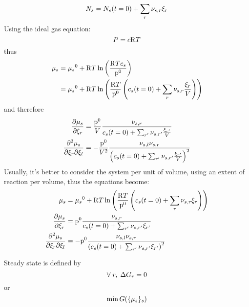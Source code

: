 \begin{equation}
\Mol[s] = \Mol[s](t=0) + \sum_r \scoef[s,r] \ext[r]
\end{equation}
Using the ideal gas equation:
\begin{equation}
\Press = \conc \Rg \Temp
\end{equation}
thus
\begin{equation}
\begin{split}
\chempot[s] & = \chempotZ[s] + \Rg\Temp\ln\left(\frac{\Rg \Temp \molar[s]}{\pz}\right) \\
            & = \chempotZ[s] + \Rg\Temp\ln\left(\frac{\Rg \Temp}{\pz}\left(\molar[s](t=0) + \sum_r \scoef[s,r]\frac{\ext[r]}{\Vol}\right)\right) \\
\end{split}
\end{equation}
and therefore
\begin{equation}
\begin{split}
\doverdext[r]{\chempot[s]}      & = \frac{\pz}{\Vol}\frac{\scoef[s,r]}{\molar[s](t=0) + \sum_{r'} \scoef[s,r']\frac{\ext[r']}{\Vol}}\\
\ddoverddext{\chempot[s]}{r}{l} & = -\frac{\pz}{\Vol^2}\frac{\scoef[s,l]\scoef[s,r]}{\left(\molar[s](t=0) + \sum_{r'} \scoef[s,r']\frac{\ext[r']}{\Vol}\right)^2}\\
\end{split}
\end{equation}
Usually, it's better to consider the system per unit of volume, 
using an extent of reaction per volume, thus the equations
become:
\begin{equation}
\begin{split}
\chempot[s]                     & = \chempotZ[s] + \Rg\Temp\ln\left(\frac{\Rg \Temp}{\pz}\left(\molar[s](t=0) + \sum_r \scoef[s,r]\ext[r]\right)\right) \\
\doverdext[r]{\chempot[s]}      & = \pz\frac{\scoef[s,r]}{\molar[s](t=0) + \sum_{r'} \scoef[s,r']\ext[r']}\\
\ddoverddext{\chempot[s]}{r}{l} & = -\pz\frac{\scoef[s,l]\scoef[s,r]}{\left(\molar[s](t=0) + \sum_{r'} \scoef[s,r']\ext[r']\right)^2}\\
\end{split}
\end{equation}

Steady state is defined by 
\begin{equation}
\forall\; r,\; \DGibbs_r = 0
\end{equation} 
or 
\begin{equation}
\min \Gibbs(\{\chempot[s]\}_s)
\end{equation}

